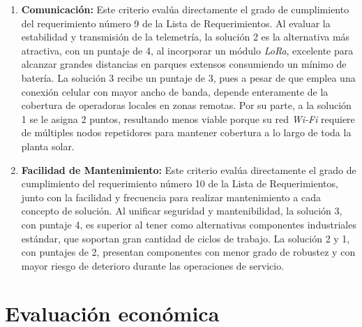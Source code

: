 \documentclass[../../General.tex]{subfiles}
\begin{document}
\begin{enumerate}
	\item \textbf{Comunicación:} Este criterio evalúa directamente el grado de cumplimiento del requerimiento número 9 de la Lista de Requerimientos.
	Al evaluar la estabilidad y transmisión de la telemetría, la solución 2 es la alternativa más atractiva, con un puntaje de 4, al incorporar un módulo \textit{LoRa}, excelente para alcanzar grandes distancias en parques extensos consumiendo un mínimo de batería. La solución 3 recibe un puntaje de 3, pues a pesar de que emplea una conexión celular con mayor ancho de banda, depende enteramente de la cobertura de operadoras locales en zonas remotas. Por su parte, a la solución 1 se le asigna 2 puntos, resultando menos viable porque su red \textit{Wi-Fi} requiere de múltiples nodos repetidores para mantener cobertura a lo largo de toda la planta solar.
	
	\item \textbf{Facilidad de Mantenimiento:} Este criterio evalúa directamente el grado de cumplimiento del requerimiento número 10 de la Lista de Requerimientos, junto con la facilidad y frecuencia para realizar mantenimiento a cada concepto de solución.
	Al unificar seguridad y mantenibilidad, la solución 3, con puntaje 4, es superior al tener como alternativas componentes industriales estándar, que soportan gran cantidad de ciclos de trabajo. La solución 2 y 1, con puntajes de 2, presentan componentes con menor grado de robustez y con mayor riesgo de deterioro durante las operaciones de servicio.
\end{enumerate}


\section{Evaluación económica}
\end{document}
